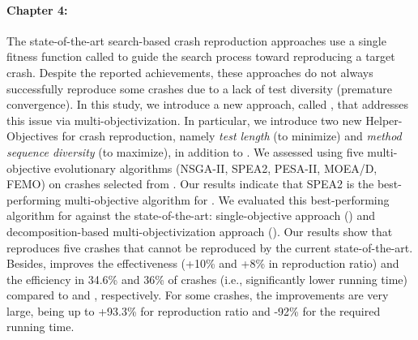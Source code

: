 \paragraph{Chapter 4:}%
The state-of-the-art search-based crash reproduction approaches use a single fitness function called \CrashFunction to guide the search process toward reproducing a target crash. Despite the reported achievements, these approaches do not always successfully reproduce some crashes due to a lack of test diversity (premature convergence). In this study, we introduce a new approach, called \moho, that addresses this issue via multi-objectivization. In particular, we introduce two new Helper-Objectives for crash reproduction, namely \textit{test length} (to minimize) and \textit{method sequence diversity} (to maximize), in addition to \CrashFunction.
We assessed \moho using five multi-objective evolutionary algorithms (NSGA-II, SPEA2, PESA-II, MOEA/D, FEMO) on crashes selected from \crashpack. Our results indicate that SPEA2 is the best-performing multi-objective algorithm for \moho.
We evaluated this best-performing algorithm for \moho against the state-of-the-art: single-objective approach (\SGGA) and decomposition-based multi-objectivization approach (\decomposition). Our results show that \moho reproduces five crashes that cannot be reproduced by the current state-of-the-art. Besides, \moho improves the effectiveness (+10\% and +8\% in reproduction ratio) and the efficiency in 34.6\% and 36\% of crashes (i.e., significantly lower running time) compared to  \SGGA and \decomposition, respectively. For some crashes, the improvements are very large, being up to +93.3\% for reproduction ratio and -92\% for the required running time. 

